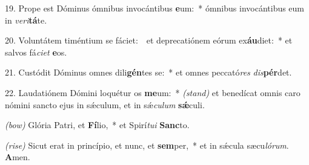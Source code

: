 19. Prope est Dóminus ómnibus invocántibus \textbf{e}um:~*
	ómnibus invocántibus eum in \textit{ve}\textit{ri}\textbf{tá}te.

20. Voluntátem timéntium se fáciet:~\GreDagger\
	et deprecatiónem eórum ex\textbf{áu}diet:~*
	et salvos fá\textit{ci}\textit{et} \textbf{e}os.

21. Custódit Dóminus omnes dili\textbf{gén}tes se:~*
	et omnes peccató\textit{res} \textit{dis}\textbf{pér}det.

22. Laudatiónem Dómini loquétur os \textbf{me}um:~* {\color{red}\textit{(stand)}}
	et benedícat omnis caro nómini sancto ejus in s\'{\ae}culum, et in s\'{\ae}\textit{cu}\textit{lum} \textbf{s\'{\ae}}culi.

{\color{red}\textit{(bow)}} Glória Patri, et \textbf{Fí}lio,~*
	et Spirí\textit{tu}\textit{i} \textbf{Sanc}to.

{\color{red}\textit{(rise)}} Sicut erat in princípio, et nunc, et \textbf{sem}per,~*
	et in s\'{\ae}cula sæcu\textit{ló}\textit{rum}. \textbf{A}men.